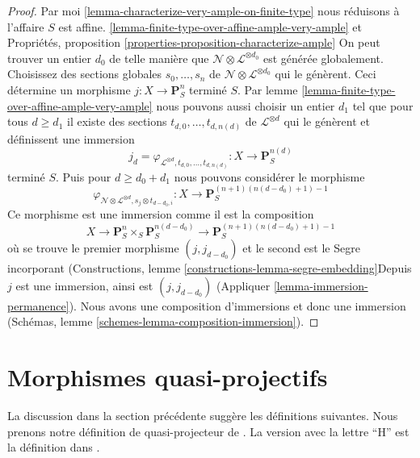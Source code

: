 \begin{proof}

Par moi \ref{lemma-characterize-very-ample-on-finite-type}
nous réduisons à l'affaire $S$ est affine. \ref{lemma-finite-type-over-affine-ample-very-ample} et Propriétés, proposition \ref{properties-proposition-characterize-ample}
On peut trouver un entier $d_0$ de telle manière que
$\mathcal{N} \otimes \mathcal{L}^{\otimes d_0}$
est générée globalement. Choisissez des sections globales
$s_0, \ldots, s_n$ de $\mathcal{N} \otimes \mathcal{L}^{\otimes d_0}$
qui le génèrent. Ceci détermine un morphisme
$j : X \to \mathbf{P}^n_S$ terminé $S$. Par lemme \ref{lemma-finite-type-over-affine-ample-very-ample}
nous pouvons aussi choisir un entier $d_1$ tel que pour tous $d \geq d_1$
il existe des sections $t_{d, 0}, \ldots, t_{d, n(d)}$
de $\mathcal{L}^{\otimes d}$ qui le génèrent et définissent une immersion
$$
j_d = \varphi_{\mathcal{L}^{\otimes d}, t_{d, 0}, \ldots, t_{d, n(d)}} :
X
\longrightarrow
\mathbf{P}^{n(d)}_S
$$
terminé $S$. Puis pour $d \geq d_0 + d_1$ nous pouvons considérer le morphisme
$$
\varphi_{\mathcal{N} \otimes \mathcal{L}^{\otimes d},
s_j \otimes t_{d - d_0, i}} :
X
\longrightarrow
\mathbf{P}^{(n + 1)(n(d - d_0) + 1) - 1}_S
$$
Ce morphisme est une immersion comme il est la composition
$$
X \to \mathbf{P}^n_S \times_S \mathbf{P}^{n(d - d_0)}_S
\to \mathbf{P}^{(n + 1)(n(d - d_0) + 1) - 1}_S
$$
où se trouve le premier morphisme $(j, j_{d - d_0})$ et le second est le Segre incorporant (Constructions, lemme \ref{constructions-lemma-segre-embedding}Depuis $j$ est une immersion, ainsi est $(j, j_{d - d_0})$
(Appliquer \ref{lemma-immersion-permanence}). Nous avons une composition d'immersions et donc une immersion (Schémas, lemme \ref{schemes-lemma-composition-immersion}).

\end{proof}










\section{Morphismes quasi-projectifs}
\label{section-quasi-projective}

\noindent
La discussion dans la section précédente suggère les définitions suivantes. Nous prenons notre définition de quasi-projecteur de \cite{EGA}. La version avec la lettre ``H'' est la définition dans \cite{H}.

